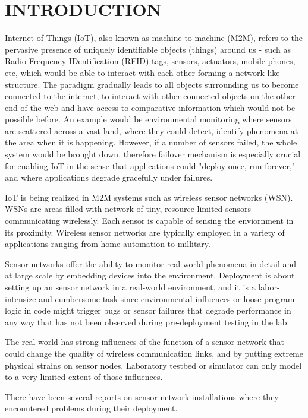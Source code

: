 \cleardoublepage
\singlespacing
\chapter{INTRODUCTION}
\label{c:intro}
\doublespacing\nointerlineskip

Internet-of-Things (IoT), also known as machine-to-machine (M2M), refers to the
pervasive presence of uniquely identifiable objects (things) around us - such as
Radio Frequency IDentification (RFID) tags, sensors,
actuators, mobile phones, etc, which would be able to interact with each
other forming a network like structure. 
The paradigm gradually leads to all objects surrounding us to become connected
to the internet, to interact with other connected objects on the other end of
the web and have access to comparative information which would not be possible
before.
An example would be environmental monitoring where sensors are scattered across
a vast land, where they could detect, identify phenomena at the area when it is
happening. However, if a number of sensors failed, the whole system would be
brought down, therefore failover mechanism is especially crucial for enabling
IoT in the sense that applications could "deploy-once, run forever," and where
applications degrade gracefully under failures.

IoT is being realized in M2M systems such as wireless sensor networks (WSN).
WSNs are areas filled with network of tiny, resource limited sensors
communicating wirelessly. Each sensor is capable of sensing the enviornment in
its proximity. Wireless sensor networks are typically employed in a variety of
applications ranging from home automation to millitary.

Sensor networks offer the ability to monitor real-world phenomena in detail and
at large scale by embedding devices into the environment. Deployment is
about setting up an sensor network in a real-world environment, and it is
a labor-intensize and cumbersome task since environmental influences or
loose program logic in code might trigger bugs or sensor failures that
degrade performance in any way that has not been observed during pre-deployment
testing in the lab.

The real world has strong influences of the function of a sensor network that
could change the quality of wireless communication links, and by putting
extreme physical strains on sensor nodes. Laboratory testbed or simulator can 
only model to a very limited extent of those influences.

There have been several reports on sensor network installations where they
encountered problems during their
deployment\cite{Barrenetxea2008,Polastre2004,Arora2004,Tateson2005,Padhy2005,Stoianov2007,Tolle2005,Werner-Allen2006a}.

